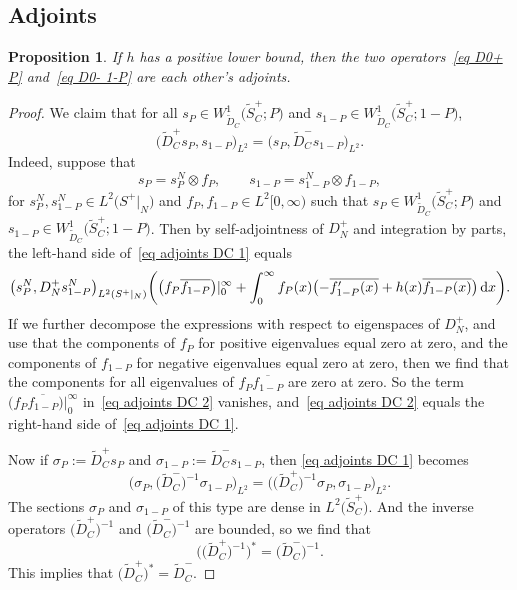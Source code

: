 \documentclass[10pt,a4paper]{amsart}
\numberwithin{equation}{section}
\newtheorem{Proposition}[Theorem]{Proposition}
 { \theoremstyle{definition}
\newtheorem{Definition}[Theorem]{Definition}
\newtheorem{Note}[Theorem]{Note}
\newtheorem{Example}[Theorem]{Example}
\newtheorem{Remark}[Theorem]{Remark} }
\begin{document}
\subsection{Adjoints}\label{sec adjoints}

\begin{Proposition}\label{prop adjoints DC}
If $h$ has a positive lower bound, then
the two operators~\eqref{eq D0+ P} and~\eqref{eq D0- 1-P} are each other's adjoints.
\end{Proposition}
\begin{proof}
We claim that for all $s_P \in W^1_{\widetilde{D}_C}\big(\widetilde{S}_C^+; P\big)$ and $s_{1-P} \in W^1_{\widetilde{D}_C}\big(\widetilde{S}_C^+; 1-P\big)$,
\begin{equation}
\label{eq adjoints DC 1}
\big(\widetilde{D}_C^+ s_P, s_{1-P}\big)_{L^2} = \big(s_P, \widetilde{D}_C^- s_{1-P}\big)_{L^2}.
\end{equation}
Indeed, suppose that
\[
s_P = s_P^N \otimes f_{P},\qquad s_{1-P} = s_{1-P}^N \otimes f_{1-P},
\]
for $s_P^N, s_{1-P}^N \in L^2\big(S^+|_N\big)$ and $f_P, f_{1-P} \in L^2[0, \infty)$ such that $s_P \in W^1_{\widetilde{D}_C}\big(\widetilde{S}_C^+; P\big)$ and $s_{1-P} \in W^1_{\widetilde{D}_C}\big(\widetilde{S}_C^+; 1-P\big)$. Then by self-adjointness of $D_N^+$ and integration by parts, the left-hand side of~\eqref{eq adjoints DC 1} equals
\begin{equation} \label{eq adjoints DC 2}
\big(s_P^N, D_N^+ s_{1-P}^N\big)_{L^2(S^+|_N)} \bigg(
\big(f_P \overline{f_{1-P}}\big)|_{0}^{\infty} + \int_0^{\infty} f_P(x)\bigl(-\overline{f_{1-P}'(x)} +h(x) \overline{f_{1-P}(x)}\bigr)\, {\rm d}x\bigg).
\end{equation}
If we further decompose the expressions with respect to eigenspaces of $D_N^+$, and use that the components of $f_P$ for positive eigenvalues equal zero at zero, and the components of $f_{1-P}$ for negative eigenvalues equal zero at zero, then we find that the components for all eigenvalues of $f_P \overline{f_{1-P}}$ are zero at zero. So the term $\big(f_P \overline{f_{1-P}}\big)|_{0}^{\infty} $ in~\eqref{eq adjoints DC 2} vanishes, and~\eqref{eq adjoints DC 2} equals the right-hand side of~\eqref{eq adjoints DC 1}.

Now if $\sigma_P := \widetilde{D}_C^+ s_P$ and $\sigma_{1-P} := \widetilde{D}_C^- s_{1-P}$, then
\eqref{eq adjoints DC 1} becomes
\[
\big( \sigma_P, \big(\widetilde{D}_C^-\big)^{-1} \sigma_{1-P}\big)_{L^2} = \big( \big(\widetilde{D}_C^+\big)^{-1}\sigma_P, \sigma_{1-P}\big)_{L^2}.
\]
The sections $\sigma_P$ and $\sigma_{1-P}$ of this type are dense in $L^2\big(\widetilde{S}_C^+\big)$. And the inverse operators $\big(\widetilde{D}_C^+\big)^{-1}$ and $\big(\widetilde{D}_C^-\big)^{-1}$ are bounded, so we find that
\[
\big(\big(\widetilde{D}_C^+\big)^{-1}\big)^* = \big(\widetilde{D}_C^-\big)^{-1}.
\]
This implies that $\big(\widetilde{D}_C^+\big)^* = \widetilde{D}_C^-$.
\end{proof}
\end{document}
